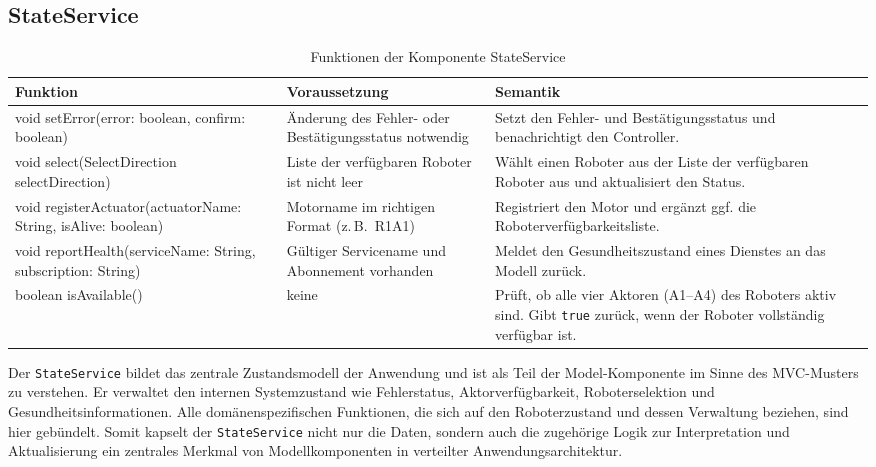 \subsection{StateService}
\begin{table}[h!]
    \centering
    \begin{tabular}{|p{5cm}|p{5cm}|p{5cm}|}
        \hline
        \textbf{Funktion} & \textbf{Voraussetzung} & \textbf{Semantik} \\
        \hline
        void setError(error: boolean, confirm: boolean) & Änderung des Fehler- oder Bestätigungsstatus notwendig & Setzt den Fehler- und Bestätigungsstatus und benachrichtigt den Controller. \\
        \hline
        void select(SelectDirection selectDirection) & Liste der verfügbaren Roboter ist nicht leer & Wählt einen Roboter aus der Liste der verfügbaren Roboter aus und aktualisiert den Status. \\
        \hline
        void registerActuator(actuatorName: String, isAlive: boolean) & Motorname im richtigen Format (z.\,B.\ R1A1) & Registriert den Motor und ergänzt ggf. die Roboterverfügbarkeitsliste. \\
        \hline
        void reportHealth(serviceName: String, subscription: String) & Gültiger Servicename und Abonnement vorhanden & Meldet den Gesundheitszustand eines Dienstes an das Modell zurück. \\
        \hline
        boolean isAvailable() & keine & Prüft, ob alle vier Aktoren (A1–A4) des Roboters aktiv sind. Gibt \texttt{true} zurück, wenn der Roboter vollständig verfügbar ist. \\
        \hline
    \end{tabular}
    \caption{Funktionen der Komponente StateService}
    \label{tab:StateService}
\end{table}
\clearpage
Der \texttt{StateService} bildet das zentrale Zustandsmodell der Anwendung und ist als Teil der Model-Komponente im Sinne des MVC-Musters zu verstehen. 
Er verwaltet den internen Systemzustand wie Fehlerstatus, Aktorverfügbarkeit, Roboterselektion und Gesundheitsinformationen. 
Alle domänenspezifischen Funktionen, die sich auf den Roboterzustand und dessen Verwaltung beziehen, sind hier gebündelt. 
Somit kapselt der \texttt{StateService} nicht nur die Daten, sondern auch die zugehörige Logik zur Interpretation und Aktualisierung ein zentrales Merkmal von Modellkomponenten in verteilter Anwendungsarchitektur.



